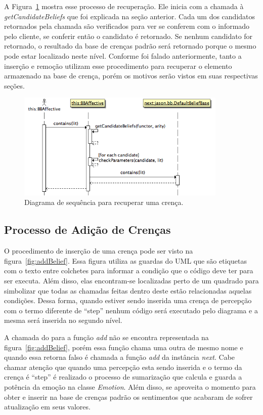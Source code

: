 A Figura~\ref{fig:recover} mostra esse processo de recuperação. Ele inicia com
a chamada à \emph{getCandidateBeliefs} que foi explicada na seção anterior.
Cada um dos candidatos retornados pela chamada são verificados para ver se
conferem com o informado pelo cliente, se conferir então o candidato é
retornado. Se nenhum candidato for retornado, o resultado da base de crenças
padrão será retornado porque o mesmo pode estar localizado neste nível.
Conforme foi falado anteriormente, tanto a inserção e remoção utilizam esse
procedimento para recuperar o elemento armazenado na base de crença, porém os
motivos serão vistos em suas respectivas seções.

\begin{figure}
  \centering
  \includegraphics[width=100mm]{figuras/sd-contains.png}
  \caption{Diagrama de sequência para recuperar uma crença.}
  \label{fig:recover}
\end{figure}

\subsection{Processo de Adição de Crenças}

O procedimento de inserção de uma crença pode ser visto na
figura~\ref{fig:addBelief}. Essa figura utiliza as guardas do UML que são
etiquetas com o texto entre colchetes para informar a condição que o código
deve ter para ser executa. Além disso, elas encontram-se localizadas perto de
um quadrado para simbolizar que todas as chamadas feitas dentro deste estão
relacionadas aquelas condições. Dessa forma, quando estiver sendo inserida uma
crença de percepção com o termo diferente de ``step'' nenhum código será
executado pelo diagrama e a mesma será inserida no segundo nível.

A chamada do \jason para a função \emph{add} não se encontra representada na
figura~\ref{fig:addBelief}, porém essa função chama uma outra de mesmo nome e
quando essa retorna falso é chamada a função \emph{add} da instância
\emph{next}. Cabe chamar atenção que quando uma percepção esta sendo inserida
e o termo da crença é ``step'' é realizado o processo de sumarização que
calcula e guarda a potência da emoção na classe \emph{Emotion}. Além disso, se
aproveita o momento para obter e inserir na base de crenças padrão os
sentimentos que acabaram de sofrer atualização em seus valores.

